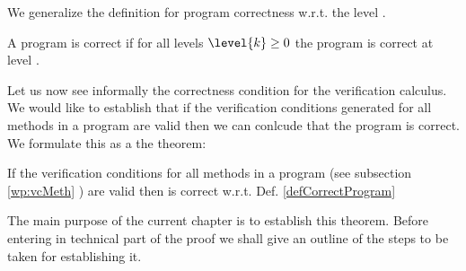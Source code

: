 We generalize the definition for program correctness w.r.t. the level . 

\begin{defCorrect}\label{defCorrectProgram}
A program is correct
if for all levels $\level{k} \ge 0 $ the program is correct at level .
\end{defCorrect}



Let us now see informally the correctness condition for the verification calculus. 
We would like to establish that if the verification conditions
generated for all methods in a program are valid then we can conlcude that the program is correct. 
We formulate this as a the theorem:
\begin{vcGenCorrect}\label{vcGenCorrect}
If the verification conditions  for all  methods in a program \Program{}  (see  subsection \ref{wp:vcMeth} )
are valid then \Program{} is correct w.r.t. Def. \ref{defCorrectProgram}
%        

\end{vcGenCorrect}

The main purpose of the current chapter is to establish this theorem. Before entering in technical part of the proof
we shall give an outline of the steps to be taken for establishing it.


